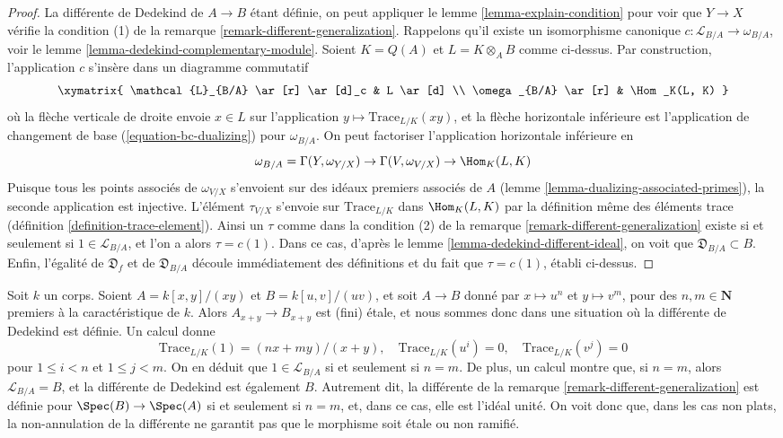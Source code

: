 \begin{proof}
La différente de Dedekind de $A \to B$ étant définie, on peut appliquer le
lemme \ref{lemma-explain-condition} pour voir que
$Y \to X$ vérifie la condition (1) de la
remarque \ref{remark-different-generalization}.
Rappelons qu'il existe un isomorphisme canonique
$c : \mathcal{L}_{B/A} \to \omega_{B/A}$, voir le
lemme \ref{lemma-dedekind-complementary-module}.
Soient $K = Q(A)$ et $L = K \otimes_A B$ comme ci-dessus.
Par construction, l'application $c$ s'insère dans un diagramme commutatif
$$
\xymatrix{
\mathcal{L}_{B/A} \ar[r] \ar[d]_c & L \ar[d] \\
\omega_{B/A} \ar[r] & \Hom_K(L, K)
}
$$
où la flèche verticale de droite envoie $x \in L$ sur l'application
$y \mapsto \text{Trace}_{L/K}(xy)$, et la flèche horizontale
inférieure est l'application de changement de base (\ref{equation-bc-dualizing}) pour $\omega_{B/A}$.
On peut factoriser l'application horizontale inférieure en
$$
\omega_{B/A} = \Gamma(Y, \omega_{Y/X})
\to \Gamma(V, \omega_{V/X}) \to \Hom_K(L, K)
$$
Puisque tous les points associés de $\omega_{V/X}$
s'envoient sur des idéaux premiers associés de $A$
(lemme \ref{lemma-dualizing-associated-primes}),
la seconde application est injective.
L'élément $\tau_{V/X}$ s'envoie sur $\text{Trace}_{L/K}$ dans
$\Hom_K(L, K)$ par la définition même des éléments trace
(définition \ref{definition-trace-element}).
Ainsi un $\tau$ comme dans la condition (2) de la
remarque \ref{remark-different-generalization}
existe si et seulement si $1 \in \mathcal{L}_{B/A}$, et l'on a alors
$\tau = c(1)$. Dans ce cas, d'après le lemme \ref{lemma-dedekind-different-ideal},
on voit que $\mathfrak{D}_{B/A} \subset B$.
Enfin, l'égalité de $\mathfrak{D}_f$ et de $\mathfrak{D}_{B/A}$
découle immédiatement des définitions et du fait que $\tau = c(1)$, établi ci-dessus.
\end{proof}

\begin{example}
\label{example-no-different}
Soit $k$ un corps. Soient $A = k[x, y]/(xy)$ et $B = k[u, v]/(uv)$, et soit
$A \to B$ donné par $x \mapsto u^n$ et $y \mapsto v^m$, pour des
$n, m \in \mathbf{N}$ premiers à la caractéristique de $k$. Alors
$A_{x + y} \to B_{x + y}$ est (fini) étale, et nous sommes donc dans une situation
où la différente de Dedekind est définie. Un calcul donne
$$
\text{Trace}_{L/K}(1) = (nx + my)/(x + y),\quad
\text{Trace}_{L/K}(u^i) = 0,\quad \text{Trace}_{L/K}(v^j) = 0
$$
pour $1 \leq i < n$ et $1 \leq j < m$. On en déduit que
$1 \in \mathcal{L}_{B/A}$ si et seulement si $n = m$. De plus, un
calcul montre que, si $n = m$, alors $\mathcal{L}_{B/A} = B$,
et la différente de Dedekind est également $B$. Autrement dit,
la différente de la remarque \ref{remark-different-generalization}
est définie pour $\Spec(B) \to \Spec(A)$
si et seulement si $n = m$, et, dans ce cas, elle est
l'idéal unité. On voit donc que, dans les cas non plats, la non-annulation
de la différente ne garantit pas que le morphisme soit étale ou non ramifié.
\end{example}







